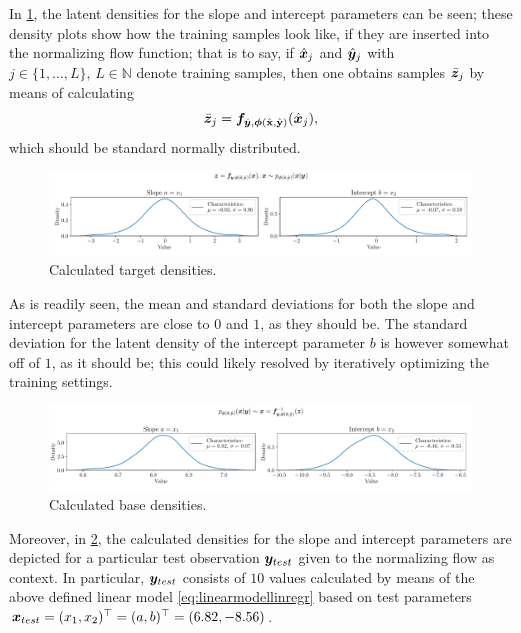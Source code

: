 \documentclass[a4paper,12pt]{report}
\begin{document}
In \cref{fig:nf-linear-regression-example-calctargetdensities}, the latent densities for the slope and intercept parameters can be seen; these density plots show how the training samples look like, if they are inserted into the normalizing flow function; that is to say, if $\hat{\bm{x}}_{j}$ and $\hat{\bm{y}}_j$ with $j \in \{1,\dots,L\},\,L \in \mathbb{N}$ denote training samples, then one obtains samples $\bar{\bm{z}}_{j}$ by means of calculating \begin{equation}
\bar{\bm{z}}_{j} = \bm{f}_{\hat{\bm{y}},\bm{\phi}(\hat{\boldsymbol{\mathbf{x}}},\hat{\boldsymbol{\mathbf{y}}})}(\hat{\bm{x}}_{j}),
\end{equation} which should be standard normally distributed.
\begin{figure}[h!]
\centering
\includegraphics[width=\textwidth]{figures/nf-linear-regression-example-calctargetdensities.pdf}
\caption{Calculated target densities.}
\label{fig:nf-linear-regression-example-calctargetdensities}
\end{figure}
As is readily seen, the mean and standard deviations for both the slope and intercept parameters are close to $0$ and $1$, as they should be. The standard deviation for the latent density of the intercept parameter $b$ is however somewhat off of $1$, as it should be; this could likely resolved by iteratively optimizing the training settings.
\begin{figure}[h!]
\centering
\includegraphics[width=\textwidth]{figures/nf-linear-regression-example-calcbasedensities.pdf}
\caption{Calculated base densities.}
\label{fig:nf-linear-regression-example-calcbasedensities}
\end{figure}

Moreover, in \cref{fig:nf-linear-regression-example-calcbasedensities}, the calculated densities for the slope and intercept parameters are depicted for a particular test observation $\bm{y}_{test}$ given to the normalizing flow as context. In particular, $\bm{y}_{test}$ consists of $10$ values calculated by means of the above defined linear model \cref{eq:linearmodellinregr} based on test parameters $\bm{x}_{test} = (x_1,x_2)^\top = (a,b)^\top = (6.82, -8.56)$.
\end{document}

